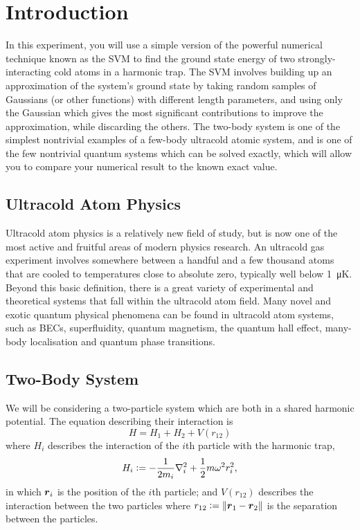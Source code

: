 \documentclass[
  a4paper,             %
  11pt,                %
  oneside,             %
  onecolumn,           %
  bibliography=totoc,  %
  final,               %
]{scrartcl}
\begin{document}
\section{Introduction}
\label{sec:introduction}

In this experiment, you will use a simple version of the powerful numerical
technique known as the \gls{SVM} to find the ground state energy of two
strongly-interacting cold atoms in a harmonic trap.  The \gls{SVM} involves
building up an approximation of the system's ground state by taking random
samples of Gaussians (or other functions) with different length parameters, and
using only the Gaussian which gives the most significant contributions to
improve the approximation, while discarding the others.  The two-body system is
one of the simplest nontrivial examples of a few-body ultracold atomic system,
and is one of the few nontrivial quantum systems which can be solved exactly,
which will allow you to compare your numerical result to the known exact value.

\subsection{Ultracold Atom Physics}
\label{subsec:ultracold_atom_physics}

Ultracold atom physics is a relatively new field of study, but is now one of the
most active and fruitful areas of modern physics research.  An ultracold gas
experiment involves somewhere between a handful and a few thousand atoms that
are cooled to temperatures close to absolute zero, typically well below
\SI{1}{\micro\kelvin}.  Beyond this basic definition, there is a great variety
of experimental and theoretical systems that fall within the ultracold atom
field.  Many novel and exotic quantum physical phenomena can be found in
ultracold atom systems, such as \glspl{BEC}, superfluidity, quantum magnetism,
the quantum hall effect, many-body localisation and quantum phase transitions.

\subsection{Two-Body System}
\label{subsec:two-body_system}

We will be considering a two-particle system which are both in a shared harmonic
potential.  The equation describing their interaction is
\begin{equation}
  \label{eq:hamiltonian_general}
  H = H_{1} + H_{2} + V(r_{12})
\end{equation}
where \(H_{i}\) describes the interaction of the \(i\)th particle with the
harmonic trap,
\begin{equation}
  H_{i} \vcentcolon= - \frac{1}{2m_{i}} \nabla_{i}^{2} + \frac{1}{2} m \omega^{2} r_{i}^{2},
\end{equation}
in which \(\boldsymbol{r}_{i}\) is the position of the \(i\)th particle; and
\(V(r_{12})\) describes the interaction between the two particles where \(r_{12}
\vcentcolon= \lVert\boldsymbol{r}_{1} - \boldsymbol{r}_{2}\rVert\) is the separation between the particles.
\end{document}
